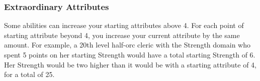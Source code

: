         \subsubsection{Extraordinary Attributes}
            Some abilities can increase your starting attributes above 4.
            For each point of starting attribute beyond 4, you increase your current attribute by the same amount.
            For example, a 20th level half-orc cleric with the Strength domain who spent 5 points on her starting Strength would have a total starting Strength of 6.
            Her Strength would be two higher than it would be with a starting attribute of 4, for a total of 25.
